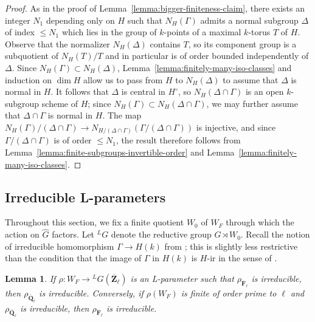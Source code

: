 \documentclass[reqno]{amsart}
\numberwithin{equation}{subsection}
\newcommand{\F}{\mathbf{F}}
\newcommand{\Q}{\mathbf{Q}}
\newcommand{\Z}{\mathbf{Z}}
\newcommand{\ol}[1]{\overline{#1}}
\newcommand{\ld}{{}^L}
\newtheorem{lemma}[thm]{Lemma}
\theoremstyle{remark}
\numberwithin{equation}{subsection}
\numberwithin{figure}{subsection}
\begin{document}
\begin{proof}
As in the proof of Lemma~\ref{lemma:bigger-finiteness-claim}, there exists an integer $N_1$ depending only on $H$ such that $N_H(\Gamma)$ admits a normal subgroup $\Delta$ of index $\leq N_1$ which lies in the group of $k$-points of a maximal $k$-torus $T$ of $H$. Observe that the normalizer $N_H(\Delta)$ contains $T$, so its component group is a subquotient of $N_H(T)/T$ and in particular is of order bounded independently of $\Delta$. Since $N_H(\Gamma) \subset N_H(\Delta)$, Lemma~\ref{lemma:finitely-many-iso-classes} and induction on $\dim H$ allow us to pass from $H$ to $N_H(\Delta)$ to assume that $\Delta$ is normal in $H$. It follows that $\Delta$ is central in $H^\circ$, so $N_H(\Delta \cap \Gamma)$ is an open $k$-subgroup scheme of $H$; since $N_H(\Gamma) \subset N_H(\Delta \cap \Gamma)$, we may further assume that $\Delta \cap \Gamma$ is normal in $H$. The map $N_H(\Gamma)/(\Delta \cap \Gamma) \to N_{H/(\Delta \cap \Gamma)}(\Gamma/(\Delta \cap \Gamma))$ is injective, and since $\Gamma/(\Delta \cap \Gamma)$ is of order $\leq N_1$, the result therefore follows from Lemma~\ref{lemma:finite-subgroups-invertible-order} and Lemma~\ref{lemma:finitely-many-iso-classes}.
\end{proof}



\subsection{Irreducible L-parameters} 

Throughout this section, we fix a finite quotient $W_0$ of $W_F$ through which the action on $\widehat{G}$ factors. Let $\ld G$ denote the reductive group $\widehat{G} \rtimes W_0$. Recall the notion of irreducible homomorphism $\Gamma \to H(k)$ from \cite[\S 10.1]{CF26a}; this is slightly less restrictive than the condition that the image of $\Gamma$ in $H(k)$ is $H$-ir in the sense of \cite{BMR05}.





\begin{lemma}\label{lemma:check-irreducibility-mod-ell}If $\rho\colon W_F \to \ld G(\ol{\Z}_\ell)$ is an L-parameter such that $\rho_{\ol{\F}_\ell}$ is irreducible, then $\rho_{\ol{\Q}_\ell}$ is irreducible. Conversely, if $\rho(W_F)$ is finite of order prime to $\ell$ and $\rho_{\ol{\Q}_\ell}$ is irreducible, then $\rho_{\ol{\F}_\ell}$ is irreducible.
\end{lemma}
\end{document}
